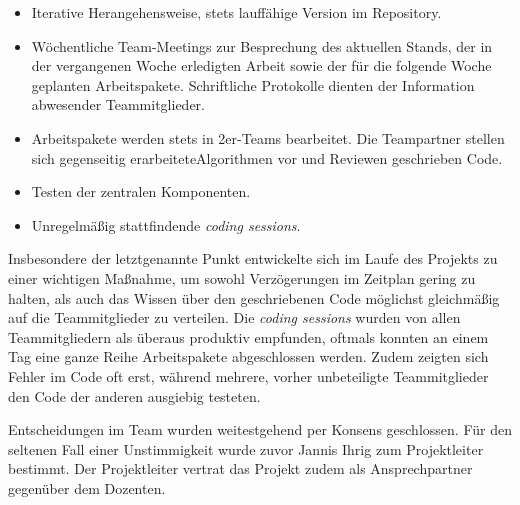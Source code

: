     \begin{itemize}
      \item Iterative Herangehensweise, stets lauffähige Version im Repository.
      \item Wöchentliche Team-Meetings zur Besprechung des aktuellen Stands, 
            der in der vergangenen Woche erledigten Arbeit sowie der für die 
            folgende Woche geplanten Arbeitspakete. Schriftliche Protokolle 
            dienten der Information abwesender Teammitglieder.
      \item Arbeitspakete werden stets in 2er-Teams bearbeitet. Die Teampartner 
            stellen sich gegenseitig erarbeiteteAlgorithmen vor und Reviewen 
            geschrieben Code.
      \item Testen der zentralen Komponenten.
      \item Unregelmäßig stattfindende \emph{coding sessions}.
    \end{itemize}

    Insbesondere der letztgenannte Punkt entwickelte sich im Laufe des Projekts
    zu einer wichtigen Maßnahme, um sowohl Verzögerungen im Zeitplan gering zu
    halten, als auch das Wissen über den geschriebenen Code möglichst
    gleichmäßig auf die Teammitglieder zu verteilen. Die \emph{coding sessions}
    wurden von allen Teammitgliedern als überaus produktiv empfunden, oftmals
    konnten an einem Tag eine ganze Reihe Arbeitspakete abgeschlossen werden.
    Zudem zeigten sich Fehler im Code oft erst, während mehrere, vorher
    unbeteiligte Teammitglieder den Code der anderen ausgiebig testeten.

    Entscheidungen im Team wurden weitestgehend per Konsens geschlossen. Für den
    seltenen Fall einer Unstimmigkeit wurde zuvor Jannis Ihrig zum Projektleiter
    bestimmt. Der Projektleiter vertrat das Projekt zudem als Ansprechpartner
    gegenüber dem Dozenten.
